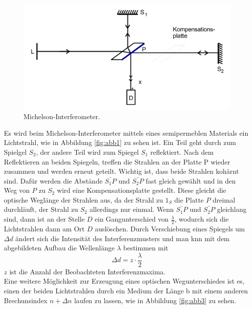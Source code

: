 \begin{figure}
    \centering
    \includegraphics{data/abb2.png}
    \caption{Michelson-Interferometer.}
    \label{fig:abb2}
\end{figure}
\FloatBarrier
Es wird beim Michelson-Interferometer mittels eines semipermeblen Materials ein Lichtstrahl, wie in Abbildung \ref{fig:abb1} zu sehen ist.
Ein Teil geht durch zum Spielgel $S_2$, der andere Teil wird zum Spiegel $S_1$ reflektiert.
Nach dem Reflektieren an beiden Spiegeln, treffen die Strahlen an der Platte P wieder zusammen und werden erneut geteilt.
Wichtig ist, dass beide Strahlen kohärnt sind.
Dafür werden die Abstände $\bar{S_1P} \text{ und } \bar{S_2P}$ fast gleich gewählt und in den Weg von $P$ zu $S_2$ wird eine Kompensationsplatte gestellt.
Diese gleicht die optische Weglänge der Strahlen aus, da der Strahl zu $1_S$ die Platte $P$ dreimal durchläuft, der Strahl zu $S_2$ allerdings nur einmal.
Wenn $\bar{S_1P} \text{ und } \bar{S_2P}$ gleichlang sind, dann ist an der Stelle $D$ ein Gangunterschied von $\frac{\lambda}{2}$, wodurch sich die Lichtstrahlen dann am Ort $D$ auslöschen.
Durch Verschiebung eines Spiegels um $\Delta d$ ändert sich die Intensität des Interferenzmusters und man knn mit dem abgebildeten Aufbau die Wellenlänge $\lambda$ bestimmen mit
\begin{equation}
    \Delta d = z \cdot \frac{\lambda}{2}
\end{equation}
$z$ ist die Anzahl der Beobachteten Interferenzmaxima. \\
Eine weitere Möglichkeit zur Erzeugung eines optischen Wegunterschiedes ist es,
einen der beiden Lichtstrahlen durch ein Medium der Länge b mit einem anderen Brechunsindex $n + \Delta n$ laufen zu lassen, wie in Abbildung \ref{fig:abb3} zu sehen.
